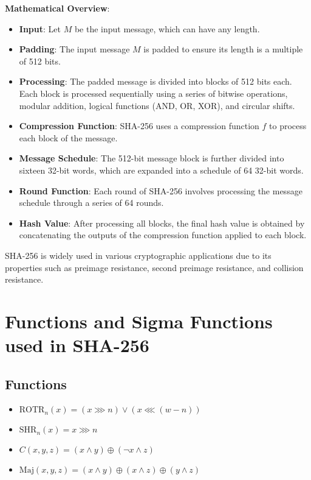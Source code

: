 \documentclass[11pt]{article}
\begin{document}
\textbf{Mathematical Overview}:
\begin{itemize}
    \item \textbf{Input}: Let \( M \) be the input message, which can have any length.
    \item \textbf{Padding}: The input message \( M \) is padded to ensure its length is a multiple of 512 bits.
    \item \textbf{Processing}: The padded message is divided into blocks of 512 bits each. Each block is processed sequentially using a series of bitwise operations, modular addition, logical functions (AND, OR, XOR), and circular shifts.
    \item \textbf{Compression Function}: SHA-256 uses a compression function \( f \) to process each block of the message.
    \item \textbf{Message Schedule}: The 512-bit message block is further divided into sixteen 32-bit words, which are expanded into a schedule of 64 32-bit words.
    \item \textbf{Round Function}: Each round of SHA-256 involves processing the message schedule through a series of 64 rounds.
    \item \textbf{Hash Value}: After processing all blocks, the final hash value is obtained by concatenating the outputs of the compression function applied to each block.
\end{itemize}

SHA-256 is widely used in various cryptographic applications due to its properties such as preimage resistance, second preimage resistance, and collision resistance.

\section*{Functions and Sigma Functions used in SHA-256}

\subsection*{Functions}

\begin{itemize}
    \item $\text{ROTR}_n(x) = (x \ggg n) \lor (x \lll (w - n))$
    \item $\text{SHR}_n(x) = x \ggg n$
    \item $C(x, y, z) = (x \land y) \oplus (\lnot x \land z)$
    \item $\text{Maj}(x, y, z) = (x \land y) \oplus (x \land z) \oplus (y \land z)$
\end{itemize}
\end{document}
